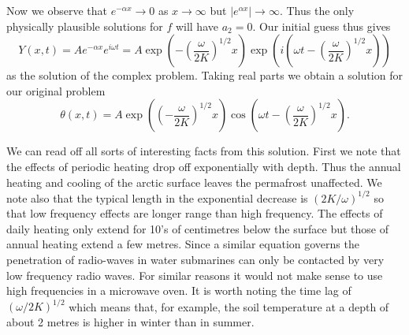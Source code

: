 Now we observe that $e^{-\alpha x}\rightarrow 0$ as
$x\rightarrow\infty$ but $|e^{\alpha x}|\rightarrow \infty$.
Thus the only physically plausible solutions for $f$
will have $a_{2}=0$. Our initial guess thus gives
\[Y(x,t)=Ae^{-\alpha x}e^{i\omega t}
=A\exp\left(-\left(\frac{\omega}{2K}\right)^{1/2}x\right)
\exp\left(i\left(\omega t-\left(\frac{\omega}{2K}\right)^{1/2}x\right)
\right)\]
as the solution of the complex problem.
Taking real parts we obtain a solution for our
original problem
\[\theta(x,t)=A\exp\left(\left(-\frac{\omega}{2K}\right)^{1/2}x\right)
\cos\left(\omega t-\left(\frac{\omega}{2K}\right)^{1/2}x\right).\]

We can read off all sorts of interesting facts from this solution.
First we note that the effects of periodic heating drop
off exponentially with depth. Thus the annual heating
and cooling of the arctic surface leaves the permafrost
unaffected. We note also that the typical length in the
exponential decrease is $(2K/\omega)^{1/2}$ so that low frequency
effects are longer range than high frequency. The effects of
daily heating only extend for 10's of centimetres below the surface
but those of annual heating extend a few metres. Since
a similar equation governs the penetration of radio-waves in
water submarines can only be contacted by very low frequency
radio waves. For similar reasons
it would not make sense to use high frequencies in
a microwave oven. It is worth noting the time lag of
$(\omega/2K)^{1/2}$ which means that, for example,
the soil temperature at a depth of about 2 metres is
higher in winter than in summer.

